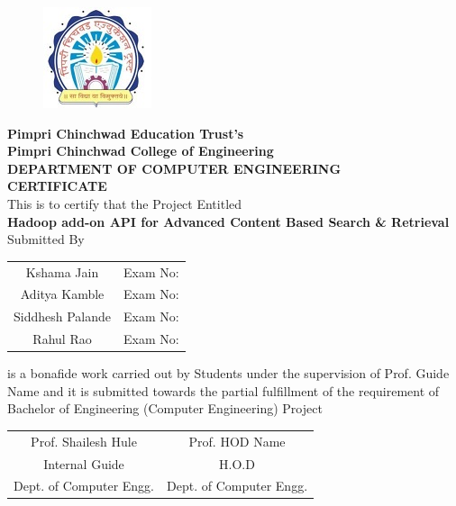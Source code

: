 \documentclass[oneside,a4paper,12pt]{report}
\begin{document}
\newpage

\thispagestyle{empty}
\begin{center}

\begin{figure}[h]
\includegraphics{college_logo}
\centering
\end{figure}

\textbf{Pimpri Chinchwad Education Trust's \\ \large Pimpri Chinchwad College of Engineering} \\[4ex]
\textbf{DEPARTMENT OF COMPUTER ENGINEERING} \\[10ex]

\textbf{\Large CERTIFICATE} \\[10ex]

This is to certify that the Project Entitled \\[4ex]
\textbf{ \Large Hadoop add-on API for Advanced Content Based Search \& Retrieval} \\[8ex]

Submitted By \\[4ex]

\begin{tabular}{cc}
Kshama Jain & Exam No: \\
Aditya Kamble & Exam No: \\
Siddhesh Palande & Exam No: \\
Rahul Rao & Exam No: \\[8ex]
\end{tabular}

is a bonafide work carried out by Students under the supervision of Prof. Guide Name and it is submitted towards the partial fulfillment of the requirement of Bachelor of Engineering (Computer Engineering) Project \\[10ex]


\end{center}

\begin{tabular}{cc}
Prof. Shailesh Hule \hspace{5cm}  & Prof. HOD Name \\
Internal Guide \hspace{5cm} &   H.O.D \\
Dept. of Computer Engg. \hspace{5cm} &  Dept. of Computer Engg. \\
\end{tabular}
\end{document}
